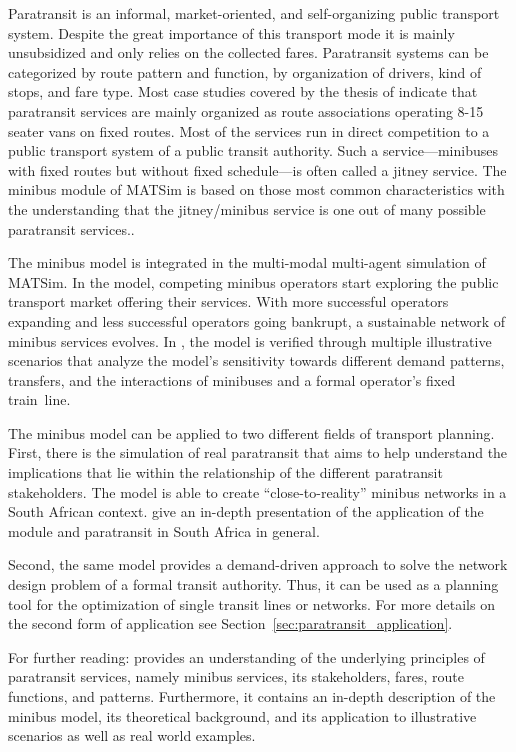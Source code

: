 Paratransit is an informal, market-oriented, and self-organizing public transport system. Despite the great importance of this transport mode it is mainly unsubsidized and only relies on the collected fares. 
Paratransit systems can be categorized by route pattern and function, by
organization of drivers, kind of stops, and fare type. Most case studies covered by the thesis of \citet[][]{Neumann_PhDThesis_2014} indicate that
paratransit services are mainly organized as route associations operating 8-15
seater vans on fixed routes. Most of the services run in direct competition to a
public transport system of a public transit authority. Such a service---minibuses with fixed routes but without fixed schedule---is often called a jitney service.
The minibus module of MATSim is based on those most common characteristics with the understanding that the jitney/minibus
service is one out of many possible paratransit services..

The minibus model is integrated in the multi-modal multi-agent simulation of MATSim. In the model, competing minibus operators start exploring the public transport market offering their services. With more successful operators expanding and less successful operators going bankrupt, a sustainable network of minibus services evolves. In \citet[][]{Neumann_PhDThesis_2014}, the model is verified through multiple illustrative scenarios that analyze the model's sensitivity towards different demand patterns, transfers, and the interactions of minibuses and a formal operator's fixed train~line.

The minibus model can be applied to two different fields of transport planning. First, there is the simulation of real paratransit that aims to help understand the implications that lie within the relationship of the different paratransit stakeholders. The model is able to create ``close-to-reality'' minibus networks in a South African context. \citet[][]{NeumannEtAl2014MinibusRSA} give an in-depth presentation of the application of the module and paratransit in South Africa in general.

Second, the same model provides a demand-driven approach to solve the network design problem of a formal transit authority. Thus, it can be used as a planning tool for the optimization of single transit lines or networks. For more details on the second form of application see Section~\ref{sec:paratransit_application}.

For further reading: \citet[][]{Neumann_PhDThesis_2014} provides an understanding of the underlying principles of paratransit services, namely minibus services, its stakeholders, fares, route functions, and patterns. Furthermore, it contains an in-depth description of the minibus model, its theoretical background, and its application to illustrative scenarios as well as real world examples.




